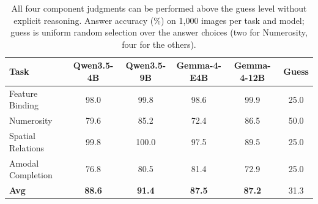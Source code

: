 \documentclass{article} %
\begin{document}
\begin{table}[t]
    \centering
    \small
    \footnotesize
    \setlength{\tabcolsep}{4.5pt}
    \caption{All four component judgments can be performed above the guess level without explicit reasoning. Answer accuracy (\%) on 1,000 images per task and model; guess is uniform random selection over the answer choices (two for Numerosity, four for the others).}
    \label{tab:primitive_behavior}
    \vspace{-1.5mm}
    \begin{tabular}{lccccc}
        \toprule
        Task
        & Qwen3.5-4B
        & Qwen3.5-9B
        & Gemma-4-E4B
        & Gemma-4-12B
        & Guess \\
        \midrule
        Feature Binding
        & 98.0
        & 99.8
        & 98.6
        & 99.9
        & 25.0 \\
        Numerosity
        & 79.6
        & 85.2
        & 72.4
        & 86.5
        & 50.0 \\
        Spatial Relations
        & 99.8
        & 100.0
        & 97.5
        & 89.5
        & 25.0 \\
        Amodal Completion
        & 76.8
        & 80.5
        & 81.4
        & 72.9
        & 25.0 \\
        \midrule
        \textbf{Avg}
        & \textbf{88.6}
        & \textbf{91.4}
        & \textbf{87.5}
        & \textbf{87.2}
        & 31.3 \\
        \bottomrule
    \end{tabular}
\end{table}
\end{document}
